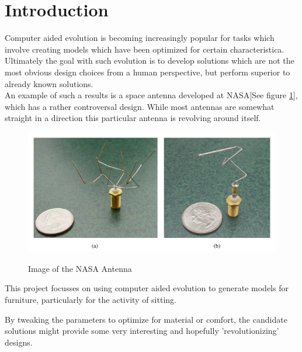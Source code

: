 \section{Introduction}
Computer aided evolution is becoming increasingly popular for tasks which involve creating models which have been optimized for certain characteristica.
Ultimately the goal with such evolution is to develop solutions which are not the most obvious design choices from a human perspective, but perform superior to already known solutions.\\

An example of such a results is a space antenna developed at NASA[See figure \ref{fig:nasa_antenna}], which has a rather controversal design. While most antennas are somewhat straight in a direction this particular antenna is revolving around itself.

\begin{figure}[ht]
\includegraphics[scale=.7]{content/img/space_antenna}
\label{fig:nasa_antenna}\\
\caption{Image of the NASA Antenna \cite{paper:ev4} }
\end{figure}

This project focusses on using computer aided evolution to generate models for furniture, particularly for the activity of sitting.

By tweaking the parameters to optimize for material or comfort, the candidate solutions might provide some very interesting and hopefully 'revolutionizing' designs.
